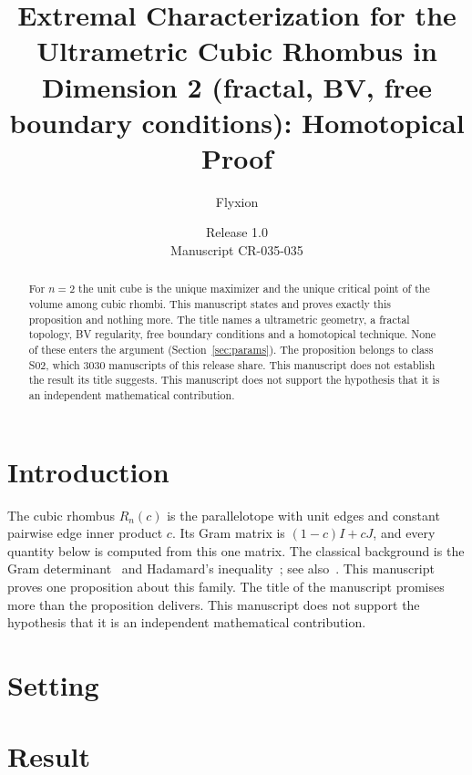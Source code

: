 \documentclass[11pt]{article}
\title{Extremal Characterization for the Ultrametric Cubic Rhombus in Dimension 2 (fractal, BV, free boundary conditions): Homotopical Proof}
\author{Flyxion}
\date{Release 1.0\\ Manuscript CR-035-035}
\begin{document}
\maketitle
\begin{abstract}
For $n=2$ the unit cube is the unique maximizer and the unique critical point of the volume among cubic rhombi. This manuscript states and proves exactly this proposition and nothing more. The title names a ultrametric geometry, a fractal topology, BV regularity, free boundary conditions and a homotopical technique. None of these enters the argument (Section~\ref{sec:params}). The proposition belongs to class S02, which 3030 manuscripts of this release share. This manuscript does not establish the result its title suggests. This manuscript does not support the hypothesis that it is an independent mathematical contribution.
\end{abstract}

\section{Introduction}
The cubic rhombus $R_n(c)$ is the parallelotope with unit edges and constant pairwise edge inner product $c$. Its Gram matrix is $(1-c)I+cJ$, and every quantity below is computed from this one matrix. The classical background is the Gram determinant~\cite{gram} and Hadamard's inequality~\cite{hadamard}; see also~\cite{hj}.
This manuscript proves one proposition about this family. The title of the manuscript promises more than the proposition delivers. This manuscript does not support the hypothesis that it is an independent mathematical contribution.

\section{Setting}


\section{Result}

\end{document}
